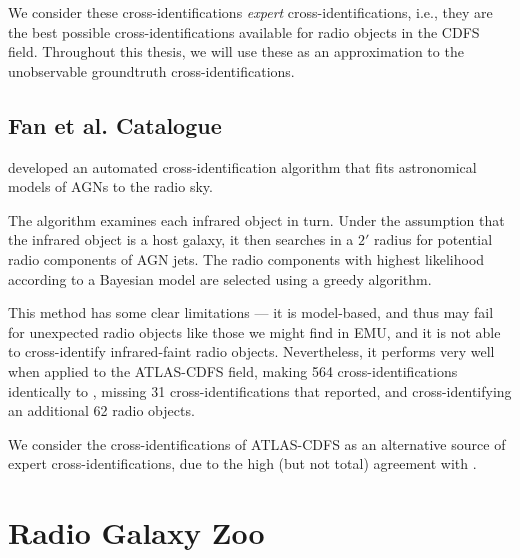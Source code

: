             We consider these cross-identifications \emph{expert}
            cross-identifications, i.e., they are the best possible
            cross-identifications available for radio objects in the CDFS field.
            Throughout this thesis, we will use these as an approximation to the
            unobservable groundtruth cross-identifications.

        \subsection{Fan et al. Catalogue}
        \label{sec:fan}

            \citet{fan15} developed an automated cross-identification algorithm
            that fits astronomical models of AGNs to the radio sky.

            The algorithm examines each infrared object in turn. Under the
            assumption that the infrared object is a host galaxy, it then
            searches in a $2'$ radius for potential radio components of AGN
            jets. The radio components with highest likelihood according to a
            Bayesian model are selected using a greedy algorithm.

            This method has some clear limitations --- it is model-based, and
            thus may fail for unexpected radio objects like those we might find
            in EMU, and it is not able to cross-identify infrared-faint radio
            objects. Nevertheless, it performs very well when applied to the
            ATLAS-CDFS field, making 564 cross-identifications identically to
            \citeauthor{norris06}, missing 31 cross-identifications that
            \citeauthor{norris06} reported, and cross-identifying an additional
            62 radio objects.

            We consider the \citeauthor{fan15} cross-identifications of
            ATLAS-CDFS as an alternative source of expert cross-identifications,
            due to the high (but not total) agreement with
            \citeauthor{norris06}.

    \section{Radio Galaxy Zoo}
    \label{sec:radio-galaxy-zoo}

